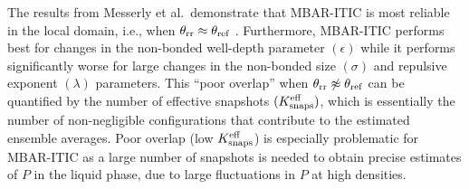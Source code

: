 \documentclass[journal=jced,manuscript=article]{achemso}
\begin{document}



The results from Messerly et al.~demonstrate that MBAR-ITIC is most reliable in the local domain, i.e., when $\theta_{\rm rr} \approx \theta_{\rm ref}$ \cite{Postdoc_1}. Furthermore, MBAR-ITIC performs best for changes in the non-bonded well-depth parameter $(\epsilon)$ while it performs significantly worse for large changes in the non-bonded size $(\sigma)$ and repulsive exponent $(\lambda)$ parameters. This ``poor overlap'' when $\theta_{\rm rr} \not\approx \theta_{\rm ref}$ can be quantified by the number of effective snapshots $(K^{\rm eff}_{\rm snaps})$, which is essentially the number of non-negligible configurations that contribute to the estimated ensemble averages. Poor overlap (low $K^{\rm eff}_{\rm snaps}$) is especially problematic for MBAR-ITIC as a large number of snapshots is needed to obtain precise estimates of $P$ in the liquid phase, due to large fluctuations in $P$ at high densities.



\end{document}
